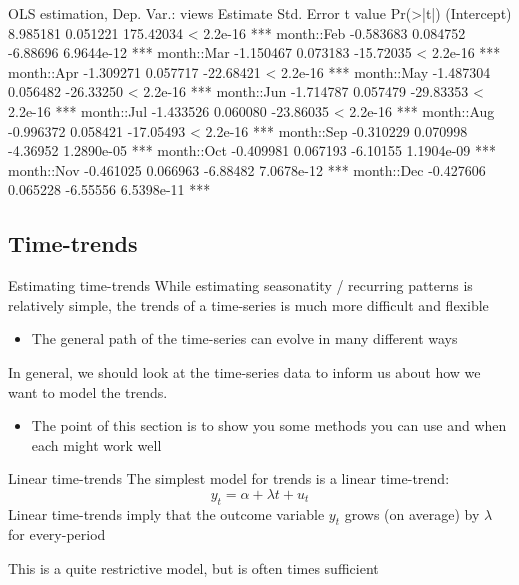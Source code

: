 \documentclass[aspectratio=169,t,11pt,table]{beamer}
\begin{document}
\begin{frame}[fragile]{}
  \begin{codeblockfootnote}[{}]
OLS estimation, Dep. Var.: views 
             Estimate Std. Error   t value   Pr(>|t|)    
(Intercept)  8.985181   0.051221 175.42034  < 2.2e-16 ***
month::Feb  -0.583683   0.084752  -6.88696 6.9644e-12 ***
month::Mar  -1.150467   0.073183 -15.72035  < 2.2e-16 ***
month::Apr  -1.309271   0.057717 -22.68421  < 2.2e-16 ***
month::May  -1.487304   0.056482 -26.33250  < 2.2e-16 ***
month::Jun  -1.714787   0.057479 -29.83353  < 2.2e-16 ***
month::Jul  -1.433526   0.060080 -23.86035  < 2.2e-16 ***
month::Aug  -0.996372   0.058421 -17.05493  < 2.2e-16 ***
month::Sep  -0.310229   0.070998  -4.36952 1.2890e-05 ***
month::Oct  -0.409981   0.067193  -6.10155 1.1904e-09 ***
month::Nov  -0.461025   0.066963  -6.88482 7.0678e-12 ***
month::Dec  -0.427606   0.065228  -6.55556 6.5398e-11 ***
  \end{codeblockfootnote}
\end{frame}



\subsection{Time-trends}

\begin{frame}{Estimating time-trends}
  While estimating seasonatity / recurring patterns is relatively simple, the trends of a time-series is much more difficult and flexible
  \begin{itemize}
    \item The general path of the time-series can evolve in many different ways
  \end{itemize}

  \bigskip
  In general, we should look at the time-series data to inform us about how we want to model the trends. 
  \begin{itemize}
    \item The point of this section is to show you some methods you can use and when each might work well
  \end{itemize}
\end{frame}

\begin{frame}{Linear time-trends}
  The simplest model for trends is a \alert{linear time-trend}:
  $$
    y_t = \alpha + \lambda t + u_t
  $$
  Linear time-trends imply that the outcome variable $y_t$ grows (on average) by $\lambda$ for every-period

  \bigskip
  This is a quite restrictive model, but is often times sufficient
\end{frame}
\end{document}
